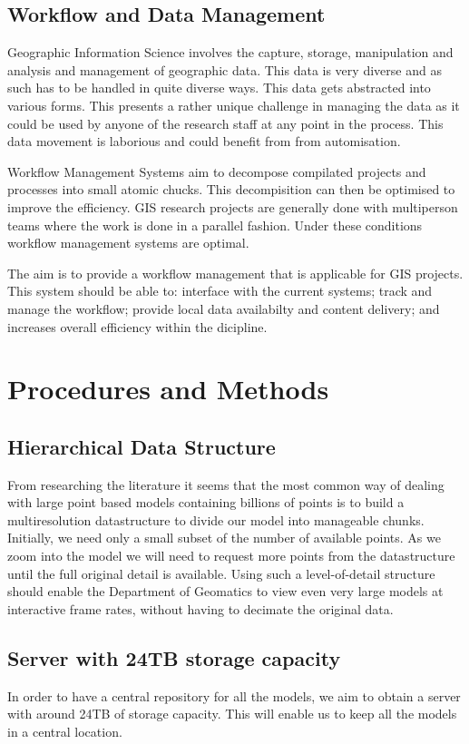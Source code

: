 \documentclass[12pt,a4paper]{article}
\begin{document}
\subsection{Workflow and Data Management}
Geographic Information Science involves the capture, storage, manipulation and analysis
and management of geographic data. This data is very diverse and as such has to be handled
in quite diverse ways. This data gets abstracted into various forms. This presents a
rather unique challenge in managing the data as it could be used by anyone of the research
staff at any point in the process. This data movement is laborious and could benefit from
from automisation.

Workflow Management Systems aim to decompose compilated projects and processes into
small atomic chucks. This decompisition can then be optimised to improve the efficiency.
GIS research projects are generally done with multiperson teams where the work is
done in a parallel fashion. Under these conditions workflow management systems
are optimal.

The aim is to provide a workflow management that is applicable for GIS projects.
This system should be able to: interface with the current systems; track and
manage the workflow; provide local data availabilty and content delivery; and
increases overall efficiency within the dicipline.

\section{Procedures and Methods}
\subsection{Hierarchical Data Structure}
From researching the literature it seems that the most common way of dealing with large point based models containing billions of points is to build a multiresolution datastructure to divide our model into manageable chunks. Initially, we need only a small subset of the number of available points. As we zoom into the model we will need to request more points from the datastructure until the full original detail is available. Using such a level-of-detail structure should enable the Department of Geomatics to view even very large models at interactive frame rates, without having to decimate the original data.
\subsection{Server with 24TB storage capacity}
In order to have a central repository for all the models, we aim to obtain a server with around 24TB of storage capacity. This will enable us to keep all the models in a central location.
\end{document}
